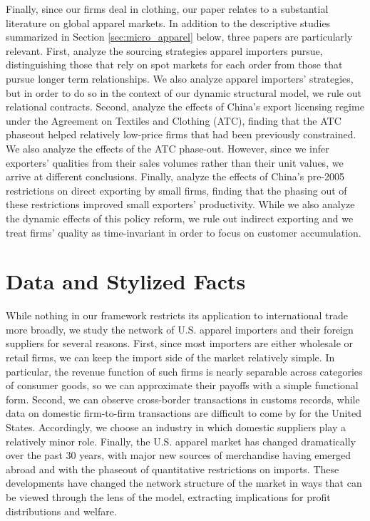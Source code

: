 \documentclass[12pt]{article} \usepackage{amsmath,amssymb,amsthm,geometry,graphicx,setspace,algorithm,algpseudocode,float}
\begin{document}
Finally, since our firms deal in clothing, our paper relates to a substantial literature on global apparel markets. In addition to the descriptive studies summarized in Section \ref{sec:micro_apparel} below, three papers are particularly relevant. First, \citet{CahalMacchiavelloNogueras2020}
analyze the sourcing strategies apparel importers pursue, distinguishing those that rely on spot markets for each order from those that pursue longer term relationships.  We also analyze apparel importers' strategies, but in order to do so in the context of our dynamic structural model, we rule out relational contracts. Second, \citet{KhandelwalSchottWei2013} analyze the effects of China's export licensing regime under the Agreement on Textiles and Clothing (ATC), finding that the ATC phaseout helped relatively low-price firms that had been previously constrained. We also analyze the effects of the ATC phase-out. However, since we infer exporters' qualities from their sales volumes rather than their unit values, we arrive at different conclusions. Finally, \citet{BaiKrishnaMa2017} analyze the effects of China's pre-2005 restrictions on direct exporting by small firms, finding that the phasing out of these restrictions improved small exporters' productivity. While we also analyze the dynamic effects of this policy reform, we rule out indirect exporting and we treat firms' quality as time-invariant in order to focus on customer accumulation. 

\section{Data and Stylized Facts}
\label{stylized_facts}
While nothing in our framework restricts its application to international trade more broadly, we study the network of U.S. apparel importers and their foreign suppliers for several reasons. First, since most importers are either wholesale or retail firms, we can keep the import side of the market relatively simple. In particular, the revenue function of such firms is nearly separable across
categories of consumer goods, so we can approximate their payoffs with a simple functional form. Second, we can observe cross-border transactions in customs records, while data on domestic firm-to-firm transactions are difficult to come by for the United States.
Accordingly, we choose an industry in which domestic suppliers play a relatively minor role. Finally, the U.S. apparel market has changed dramatically over the past 30 years, with major new sources of
merchandise having emerged abroad and with the phaseout of quantitative restrictions on imports. These developments have changed the network structure of the market in ways that can be viewed through the lens of the model, extracting implications for profit distributions and welfare.
\end{document}
